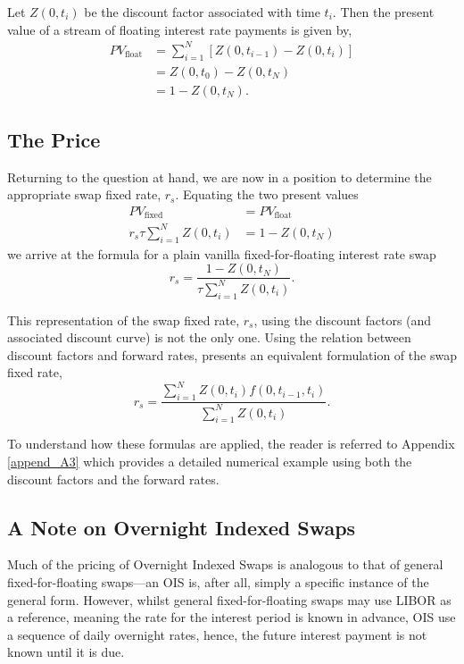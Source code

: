 \begin{definition}
\label{pv_float}
    Let $Z(0,t_i)$ be the discount factor associated with time $t_i$. Then the present value of a stream of floating interest rate payments is given by,
    \begin{align}
        PV_{\text{float}} &= \sum_{i=1}^{N} \left[ Z(0,t_{i-1})  - Z(0,t_{i})\right] \\
        &= Z(0, t_0) - Z(0, t_{N}) \\
        &= 1 - Z(0,t_N).
    \end{align}
\end{definition}

\subsection{The Price}
Returning to the question at hand, we are now in a position to determine the appropriate swap fixed rate, $r_s$. Equating the two present values
\begin{align}
    PV_{\text{fixed}} &= PV_{\text{float}} \\
    r_s \tau \sum_{i=1}^{N} Z(0,t_i) &= 1 - Z(0,t_N)
\end{align}
we arrive at the formula for a plain vanilla fixed-for-floating interest rate swap \citep{wilmott2013paul}
\begin{equation}
    r_s = \frac{1 - Z(0, t_N)}{\tau \sum_{i=1}^{N} Z(0,t_i)}.
\end{equation}

This representation of the swap fixed rate, $r_s$, using the discount factors (and associated discount curve) is not the only one. Using the relation between discount factors and forward rates, \cite{veronesi2016handbook} presents an equivalent formulation of the swap fixed rate,
\begin{equation}
    r_s = \frac{\sum_{i=1}^{N} Z(0,t_i) f(0,t_{i-1},t_i)}{\sum_{i=1}^{N} Z(0,t_i)}.
\end{equation}

To understand how these formulas are applied, the reader is referred to Appendix \ref{append_A3} which provides a detailed numerical example using both the discount factors and the forward rates. 

\subsection{A Note on Overnight Indexed Swaps}
Much of the pricing of Overnight Indexed Swaps is analogous to that of general fixed-for-floating swaps––an OIS is, after all, simply a specific instance of the general form. However, whilst general fixed-for-floating swaps may use LIBOR as a reference, meaning the rate for the interest period is known in advance, OIS use a sequence of daily overnight rates, hence, the future interest payment is not known until it is due. 

